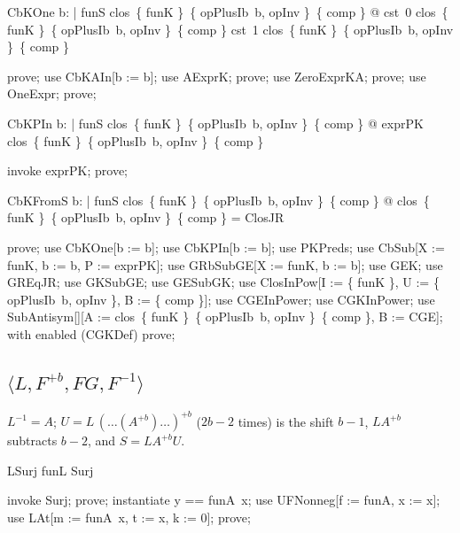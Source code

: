 \documentclass{article}
\begin{document}
\begin{theorem}{CbKOne}
  \forall b: \nat | funS \in clos~\{ funK \}~\{ opPlusIb~b, opInv \}~\{ comp \} @ cst~0 \in clos~\{ funK \}~\{ opPlusIb~b, opInv \}~\{ comp \} \land cst~1 \in clos~\{ funK \}~\{ opPlusIb~b, opInv \}~\{ comp \}
\end{theorem}

\begin{zproof}
prove;
use CbKAIn[b := b];
use AExprK;
prove;
use ZeroExprKA;
prove;
use OneExpr;
prove;
\end{zproof}

\begin{theorem}{CbKPIn}
  \forall b: \nat | funS \in clos~\{ funK \}~\{ opPlusIb~b, opInv \}~\{ comp \} @ exprPK \in clos~\{ funK \}~\{ opPlusIb~b, opInv \}~\{ comp \}
\end{theorem}

\begin{zproof}
invoke exprPK;
prove;
\end{zproof}

\begin{theorem}{CbKFromS}
  \forall b: \nat | funS \in clos~\{ funK \}~\{ opPlusIb~b, opInv \}~\{ comp \} @ clos~\{ funK \}~\{ opPlusIb~b, opInv \}~\{ comp \} = ClosJR
\end{theorem}

\begin{zproof}
prove;
use CbKOne[b := b];
use CbKPIn[b := b];
use PKPreds;
use CbSub[X := funK, b := b, P := exprPK];
use GRbSubGE[X := funK, b := b];
use GEK;
use GREqJR;
use GKSubGE;
use GESubGK;
use ClosInPow[I := \{ funK \}, U := \{ opPlusIb~b, opInv \}, B := \{ comp \}];
use CGEInPower;
use CGKInPower;
use SubAntisym[\nat \fun \nat][A := clos~\{ funK \}~\{ opPlusIb~b, opInv \}~\{ comp \}, B := CGE];
with enabled (CGKDef) prove;
\end{zproof}


\subsection{$\langle L, F^{+b}, FG, F^{-1}\rangle$}

$L^{-1} = A$; $U = L\,(\dots(A^{+b})\dots)^{+b}$ ($2b - 2$ times) is the shift $b - 1$,
$L A^{+b}$ subtracts $b - 2$, and $S = L A^{+b} U$.

\begin{theorem}{LSurj}
  funL \in Surj
\end{theorem}

\begin{zproof}
invoke Surj;
prove;
instantiate y == funA~x;
use UFNonneg[f := funA, x := x];
use LAt[m := funA~x, t := x, k := 0];
prove;
\end{zproof}
\end{document}
